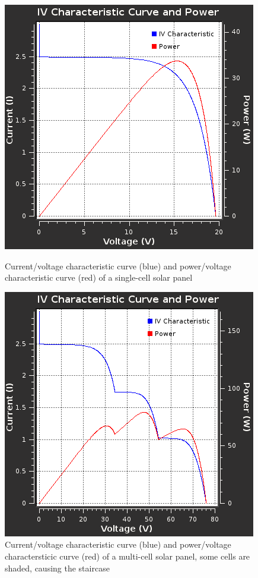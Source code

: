 \begin{figure}[th!]
    \centering
    \begin{minipage}{.4\textwidth}
        \centering
        \includegraphics[width=.95\textwidth]{images/sim/iv-simple.png}
        \caption{Current/voltage characteristic curve (blue) and power/voltage characteristic curve (red) of a single-cell solar panel}
        \label{fig:verification:iv-simple}
    \end{minipage}
    \begin{minipage}{.4\textwidth}
        \centering
        \includegraphics[width=.95\textwidth]{images/sim/iv-complicated.png}
        \caption{Current/voltage characteristic curve (blue) and power/voltage charactersticic curve (red) of a multi-cell solar panel, some cells are shaded, causing the staircase}
        \label{fig:verification:iv-complicated}
    \end{minipage}
\end{figure}


